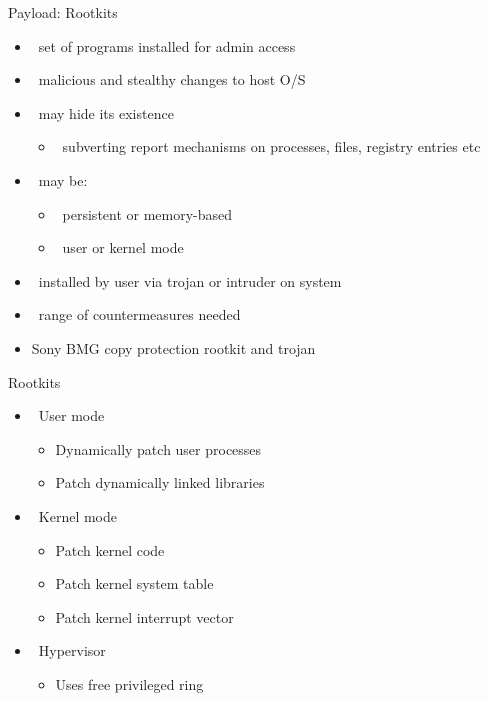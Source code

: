 \documentclass{beamer}
\begin{document}

\begin{frame}{Payload: Rootkits}
  \begin{itemize}
  \item  set of programs installed for admin access 
  \item  malicious and stealthy changes to host O/S 
  \item  may hide its existence 
    \begin{itemize}
    \item  subverting report mechanisms on processes, files, registry entries 
      etc 
    \end{itemize}
  \item  may be: 
    \begin{itemize}
    \item  persistent or memory-based 
    \item  user or kernel mode 
    \end{itemize}
  \item  installed by user via trojan or intruder on system 
  \item  range of countermeasures needed
  \item Sony BMG copy protection rootkit and trojan
  \end{itemize}
\end{frame}

\begin{frame}{Rootkits}
  \begin{itemize}
  \item  User mode
  \begin{itemize}
    \item Dynamically patch user processes
    \item Patch dynamically linked libraries
  \end{itemize}
  \item  Kernel mode
  \begin{itemize}
    \item Patch kernel code
    \item Patch kernel system table
    \item Patch kernel interrupt vector
  \end{itemize}
  \item  Hypervisor
  \begin{itemize}
    \item Uses free privileged ring
  \end{itemize}
  \end{itemize}
\end{frame}
\end{document}
